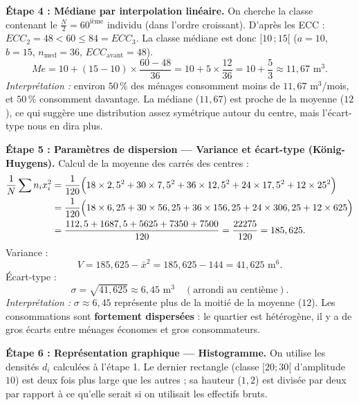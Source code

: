 \documentclass[11pt]{article}
\newcommand{\cle}[1]{{\popxbold\color{popdark}#1}}
\begin{document}
\begin{exoresolu}
\textbf{Étape 4 : Médiane par interpolation linéaire.}
On cherche la classe contenant le $\frac{N}{2} = 60^{\text{ième}}$ individu (dans l'ordre croissant).
D'après les ECC : $ECC_2 = 48 < 60 \le 84 = ECC_3$.
La \cle{classe médiane} est donc $[10\,;15[$ ($a=10$, $b=15$, $n_{\text{med}}=36$, $ECC_{\text{avant}}=48$).
\[ Me = 10 + (15-10)\times\frac{60 - 48}{36} = 10 + 5\times\frac{12}{36} = 10 + \frac{5}{3} \approx 11,67 \text{ m}^3. \]
\emph{Interprétation :} environ $50\,\%$ des ménages consomment moins de $11,67$ m$^3$/mois, et $50\,\%$ consomment davantage. La médiane ($11,67$) est proche de la moyenne ($12$), ce qui suggère une distribution assez symétrique autour du centre, mais l'écart-type nous en dira plus.

\textbf{Étape 5 : Paramètres de dispersion — Variance et écart-type (König-Huygens).}
Calcul de la moyenne des carrés des centres :
\begin{align*}
\frac{1}{N}\sum n_i x_i^2 &= \frac{1}{120}\Bigl(18\times 2,5^2 + 30\times 7,5^2 + 36\times 12,5^2 + 24\times 17,5^2 + 12\times 25^2\Bigr) \\
&= \frac{1}{120}\Bigl(18\times 6,25 + 30\times 56,25 + 36\times 156,25 + 24\times 306,25 + 12\times 625\Bigr) \\
&= \frac{112,5 + 1687,5 + 5625 + 7350 + 7500}{120} = \frac{22275}{120} = 185,625.
\end{align*}
Variance :
\[ V = 185,625 - \bar{x}^2 = 185,625 - 144 = 41,625 \text{ m}^6. \]
Écart-type :
\[ \sigma = \sqrt{41,625} \approx 6,45 \text{ m}^3 \quad (\text{arrondi au centième}). \]
\emph{Interprétation :} $\sigma \approx 6,45$ représente plus de la moitié de la moyenne ($12$). Les consommations sont \textbf{fortement dispersées} : le quartier est hétérogène, il y a de gros écarts entre ménages économes et gros consommateurs.

\textbf{Étape 6 : Représentation graphique — Histogramme.}
On utilise les densités $d_i$ calculées à l'étape 1. Le dernier rectangle (classe $[20;30[$ d'amplitude $10$) est deux fois plus large que les autres ; sa hauteur ($1,2$) est divisée par deux par rapport à ce qu'elle serait si on utilisait les effectifs bruts.


\end{exoresolu}
\end{document}
